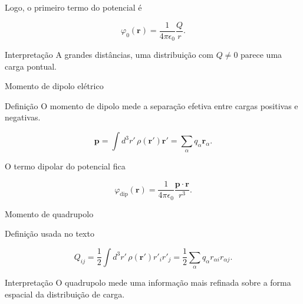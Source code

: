 \documentclass[aspectratio=169]{beamer}
\begin{document}
\begin{frame}

Logo, o primeiro termo do potencial é

\begin{eqbox}
\begin{equation}
\varphi_0(\mathbf r)
=
\frac{1}{4\pi\epsilon_0}
\frac{Q}{r}.
\label{eq:potencial_monopolo}
\end{equation}
\end{eqbox}

\begin{mybox}{Interpretação}
A grandes distâncias, uma distribuição com \(Q\neq0\) parece uma carga pontual.
\end{mybox}

\end{frame}

\begin{frame}{Momento de dipolo elétrico}

\begin{mybox}{Definição}
O momento de dipolo mede a separação efetiva entre cargas positivas e negativas.
\end{mybox}

\begin{eqbox}
\begin{equation}
\mathbf p
=
\int d^3r'\,\rho(\mathbf r')\mathbf r'
=
\sum_\alpha q_\alpha \mathbf r_\alpha .
\tag{4.5}
\label{eq:dipolo}
\end{equation}
\end{eqbox}

O termo dipolar do potencial fica

\begin{eqbox}
\begin{equation}
\varphi_{\text{dip}}(\mathbf r)
=
\frac{1}{4\pi\epsilon_0}
\frac{\mathbf p\cdot\mathbf r}{r^3}.
\tag{4.8}
\label{eq:potencial_dipolo}
\end{equation}
\end{eqbox}

\end{frame}

\begin{frame}{Momento de quadrupolo}

\begin{mybox}{Definição usada no texto}
\end{mybox}

\begin{eqbox}
\begin{equation}
Q_{ij}
=
\frac{1}{2}
\int d^3r'\,\rho(\mathbf r') r'_i r'_j
=
\frac{1}{2}
\sum_\alpha q_\alpha r_{\alpha i}r_{\alpha j}.
\tag{4.6}
\label{eq:quadrupolo}
\end{equation}
\end{eqbox}

\begin{mybox}{Interpretação}
O quadrupolo mede uma informação mais refinada sobre a forma espacial da distribuição de carga.
\end{mybox}

\end{frame}
\end{document}

